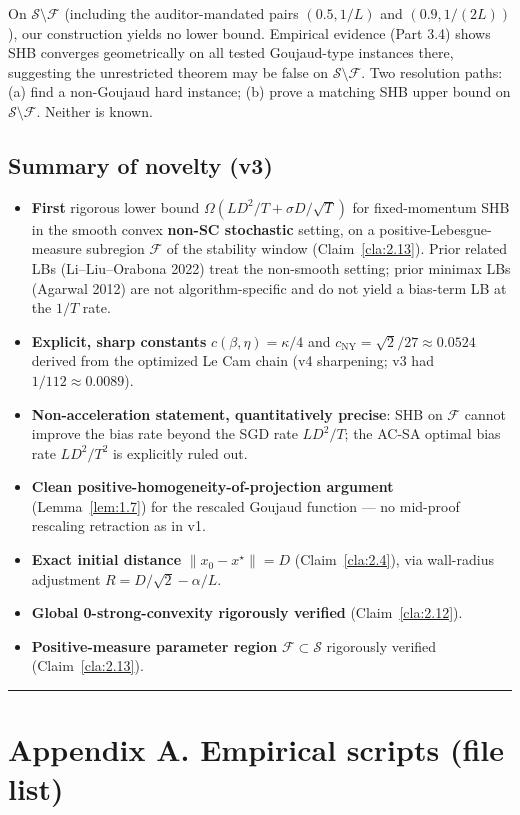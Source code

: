 \documentclass[11pt,a4paper]{article}
\theoremstyle{plain}
\theoremstyle{definition}
\theoremstyle{remark}
\newcommand{\F}{\mathcal{F}}
\newcommand{\Sset}{\mathcal{S}}
\begin{document}
On $\Sset\setminus\F$ (including the auditor-mandated pairs $(0.5, 1/L)$ and $(0.9, 1/(2L))$), our construction yields no lower bound. Empirical evidence (Part 3.4) shows SHB converges geometrically on all tested Goujaud-type instances there, suggesting the unrestricted theorem may be false on $\Sset\setminus\F$. Two resolution paths: (a) find a non-Goujaud hard instance; (b) prove a matching SHB upper bound on $\Sset\setminus\F$. Neither is known.

\subsection{Summary of novelty (v3)}

\begin{itemize}
\item \textbf{First} rigorous lower bound $\Omega(LD^2/T + \sigma D/\sqrt T)$ for fixed-momentum SHB in the smooth convex \textbf{non-SC stochastic} setting, on a positive-Lebesgue-measure subregion $\F$ of the stability window (Claim~\ref{cla:2.13}). Prior related LBs (Li--Liu--Orabona 2022) treat the non-smooth setting; prior minimax LBs (Agarwal 2012) are not algorithm-specific and do not yield a bias-term LB at the $1/T$ rate.
\item \textbf{Explicit, sharp constants} $c(\beta,\eta) = \kappa/4$ and $c_\mathrm{NY} = \sqrt 2/27 \approx 0.0524$ derived from the optimized Le Cam chain (v4 sharpening; v3 had $1/112 \approx 0.0089$).
\item \textbf{Non-acceleration statement, quantitatively precise}: SHB on $\F$ cannot improve the bias rate beyond the SGD rate $LD^2/T$; the AC-SA optimal bias rate $LD^2/T^2$ is explicitly ruled out.
\item \textbf{Clean positive-homogeneity-of-projection argument} (Lemma~\ref{lem:1.7}) for the rescaled Goujaud function --- no mid-proof rescaling retraction as in v1.
\item \textbf{Exact initial distance} $\|x_0 - x^\star\| = D$ (Claim~\ref{cla:2.4}), via wall-radius adjustment $R = D/\sqrt 2 - \alpha/L$.
\item \textbf{Global 0-strong-convexity rigorously verified} (Claim~\ref{cla:2.12}).
\item \textbf{Positive-measure parameter region} $\F \subset \Sset$ rigorously verified (Claim~\ref{cla:2.13}).
\end{itemize}

\bigskip
\hrule
\bigskip

\section*{Appendix A. Empirical scripts (file list)}
\end{document}
